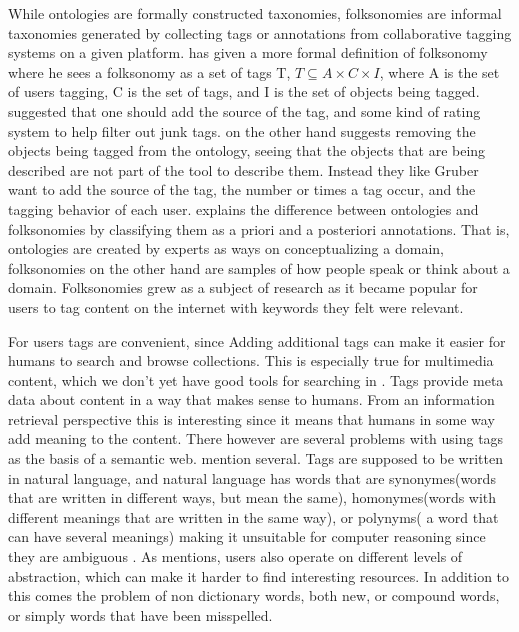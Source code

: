 While ontologies are formally constructed taxonomies, folksonomies are informal taxonomies generated by collecting tags or annotations from collaborative tagging systems on a given platform\citep{Tang2009}. 
\citet{Mika2005} has given a more formal definition of folksonomy where he sees a folksonomy as a set of tags T, 
$T \subseteq A \times C \times I$, where A is the set of users tagging, C is the set of tags, and I is the set of objects being tagged.
\citet{Gruber2007} suggested that one should add the source of the tag, and some kind of rating system to help filter out junk tags. 
\citet{Scerri2008} on the other hand suggests removing the objects being tagged from the ontology, 
seeing that the objects that are being described are not part of the tool to describe them.
Instead they like Gruber want to add the source of the tag, the number or times a tag occur, and the tagging behavior of each user.
\citet{Bang2008} explains the difference between ontologies and folksonomies by classifying them as a priori and a posteriori annotations. 
That is, ontologies are created by experts as ways on conceptualizing a domain, folksonomies on the other hand are samples of how people speak or think about a domain.
Folksonomies grew as a subject of research as it became popular for users to tag content on the internet with keywords they felt were relevant.

For users tags are convenient, since Adding additional tags can make it easier for humans to search and browse collections. This is especially true for multimedia content, which we don't yet have good tools for searching in \citep{Weinberger2008}.
Tags provide meta data about content in a way that makes sense to humans. From an information retrieval perspective this is interesting since it means that humans in some way add meaning to the content.
There however are several problems with using tags as the basis of a semantic web. \citet{Tang2009} mention several. 
Tags are supposed to be written in natural language, and natural language has words that are synonymes(words that are written in different ways, 
but mean the same), homonymes(words with different meanings that are written in the same way), or polynyms( a word that can have several meanings) 
making it unsuitable for computer reasoning since they are ambiguous \citep{Passant2008}. 
As \citet{Golder2005} mentions, users also operate on different levels of abstraction, which can make it harder to find interesting resources.
In addition to this comes the problem of non dictionary words, both new, or compound words, or simply words that have been misspelled\citep{Tonkin2006}.


